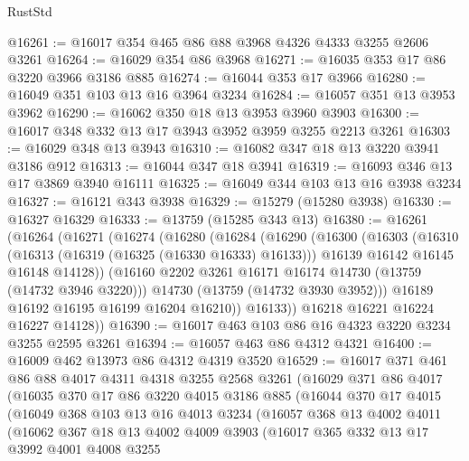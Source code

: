\begin{lexlean}{RustStd}
\begin{coremodule}
@16261 := @16017 @354 @465 @86 @88 @3968 @4326 @4333 @3255 @2606 @3261
@16264 := @16029 @354 @86 @3968
@16271 := @16035 @353 @17 @86 @3220 @3966 @3186 @885
@16274 := @16044 @353 @17 @3966
@16280 := @16049 @351 @103 @13 @16 @3964 @3234
@16284 := @16057 @351 @13 @3953 @3962
@16290 := @16062 @350 @18 @13 @3953 @3960 @3903
@16300 := @16017 @348 @332 @13 @17 @3943 @3952 @3959 @3255 @2213 @3261
@16303 := @16029 @348 @13 @3943
@16310 := @16082 @347 @18 @13 @3220 @3941 @3186 @912
@16313 := @16044 @347 @18 @3941
@16319 := @16093 @346 @13 @17 @3869 @3940 @16111
@16325 := @16049 @344 @103 @13 @16 @3938 @3234
@16327 := @16121 @343 @3938
@16329 := @15279 (@15280 @3938)
@16330 := @16327 @16329
@16333 := @13759 (@15285 @343 @13)
@16380 := @16261
    (@16264
      (@16271
        (@16274
          (@16280
            (@16284
              (@16290
                (@16300
                  (@16303
                    (@16310
                      (@16313 (@16319 (@16325 (@16330 @16333) @16133)))
                      @16139
                      @16142
                      @16145
                      @16148
                      @14128))
                  (@16160 @2202 @3261 @16171 @16174 @14730 (@13759 (@14732 @3946 @3220)))
                  @14730
                  (@13759 (@14732 @3930 @3952)))
                @16189
                @16192
                @16195
                @16199
                @16204
                @16210))
            @16133))
        @16218
        @16221
        @16224
        @16227
        @14128))
@16390 := @16017 @463 @103 @86 @16 @4323 @3220 @3234 @3255 @2595 @3261
@16394 := @16057 @463 @86 @4312 @4321
@16400 := @16009 @462 @13973 @86 @4312 @4319 @3520
@16529 := @16017
    @371
    @461
    @86
    @88
    @4017
    @4311
    @4318
    @3255
    @2568
    @3261
    (@16029
      @371
      @86
      @4017
      (@16035
        @370
        @17
        @86
        @3220
        @4015
        @3186
        @885
        (@16044
          @370
          @17
          @4015
          (@16049
            @368
            @103
            @13
            @16
            @4013
            @3234
            (@16057
              @368
              @13
              @4002
              @4011
              (@16062
                @367
                @18
                @13
                @4002
                @4009
                @3903
                (@16017
                  @365
                  @332
                  @13
                  @17
                  @3992
                  @4001
                  @4008
                  @3255

\end{coremodule}
\end{lexlean}

